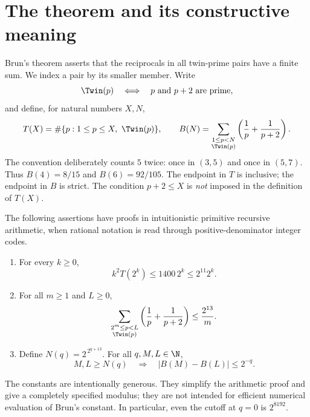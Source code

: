 \section{The theorem and its constructive meaning}
\label{sec:statement}

Brun's theorem asserts that the reciprocals in all twin-prime pairs have
a finite sum. We index a pair by its smaller member. Write
\[
 \Twin(p)\quad\Longleftrightarrow\quad
 p\text{ and }p+2\text{ are prime},
\]
and define, for natural numbers \(X,N\),
\[
 T(X)=\#\{p:1\le p\le X,\ \Twin(p)\},\qquad
 B(N)=\sum_{\substack{1\le p<N\\\Twin(p)}}
       \left(\frac1p+\frac1{p+2}\right).
\]
The convention deliberately counts \(5\) twice: once in \((3,5)\) and once
in \((5,7)\). Thus \(B(4)=8/15\) and \(B(6)=92/105\).
The endpoint in \(T\) is inclusive; the endpoint in \(B\) is strict.
The condition \(p+2\le X\) is \emph{not} imposed in the definition of \(T(X)\).

\begin{theorem}
\label{thm:main}
The following assertions have proofs in intuitionistic primitive recursive
arithmetic, when rational notation is read through positive-denominator
integer codes.
\begin{enumerate}[label=(\roman*)]
\item For every \(k\ge0\),
\begin{equation}
 k^2T(2^k)\le 1400\,2^k\le 2^{11}2^k.
 \label{eq:main-count}
\end{equation}
\item For all \(m\ge1\) and \(L\ge0\),
\begin{equation}
 \sum_{\substack{2^m\le p<L\\\Twin(p)}}
 \left(\frac1p+\frac1{p+2}\right)
 \le \frac{2^{13}}m.
 \label{eq:main-tail}
\end{equation}
\item Define \(N(q)=2^{\,2^{q+13}}\). For all \(q,M,L\in\N\),
\begin{equation}
 M,L\ge N(q)\quad\Longrightarrow\quad
 \lvert B(M)-B(L)\rvert\le 2^{-q}.
 \label{eq:main-cauchy}
\end{equation}
\end{enumerate}
\end{theorem}

The constants are intentionally generous. They simplify the arithmetic
proof and give a completely specified modulus; they are not intended for
efficient numerical evaluation of Brun's constant. In particular, even the
cutoff at \(q=0\) is \(2^{8192}\).

